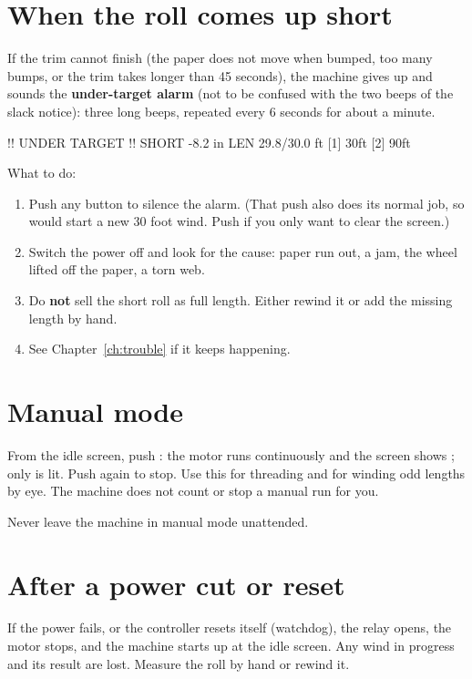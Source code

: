 \section{When the roll comes up short}\label{sec:under-target}
If the trim cannot finish (the paper does not move when bumped, too many
bumps, or the trim takes longer than 45 seconds), the machine gives up and
sounds the \textbf{under-target alarm} (not to be confused with the two beeps of the slack notice): three long beeps, repeated every 6
seconds for about a minute.

\begin{lcd}
 !! UNDER TARGET !!
SHORT -8.2 in
LEN 29.8/30.0 ft
[1] 30ft    [2] 90ft
\end{lcd}

What to do:
\begin{enumerate}
  \item Push any button to silence the alarm. (That push also does its
        normal job, so  would start a new 30 foot wind. Push 
        if you only want to clear the screen.)
  \item Switch the power off and look for the cause: paper run out, a jam,
        the wheel lifted off the paper, a torn web.
  \item Do \textbf{not} sell the short roll as full length. Either rewind it
        or add the missing length by hand.
  \item See Chapter~\ref{ch:trouble} if it keeps happening.
\end{enumerate}

\section{Manual mode}\label{sec:manual}
From the idle screen, push : the motor runs continuously and the
screen shows ; only  is lit. Push 
again to stop. Use this for threading and for winding odd lengths by eye. The
machine does not count or stop a manual run for you.
\begin{warning}
Never leave the machine in manual mode unattended.
\end{warning}

\section{After a power cut or reset}
If the power fails, or the controller resets itself (watchdog), the relay
opens, the motor stops, and the machine starts up at the idle screen. Any
wind in progress and its result are lost. Measure the roll by hand or rewind
it.
